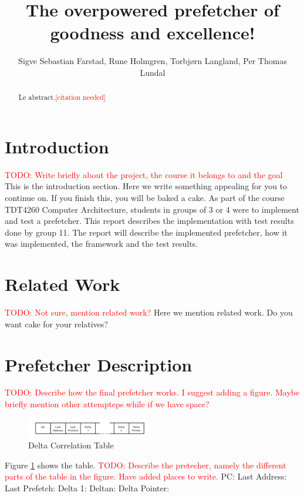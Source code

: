 \documentclass[a4paper]{IEEEtran}
\title{The overpowered prefetcher of goodness and excellence!}
\author{
    Sigve Sebastian Farstad,
    Rune Holmgren,
    Torbjørn Langland,
    Per Thomas Lundal
}
\newcommand\TODO[1]{\textcolor{red}{TODO:#1}}
\newcommand\todo[1]{\TODO{#1}}
\newcommand\cn{\textcolor{red}{[citation needed]}}
\begin{document}
\maketitle

\begin{abstract}
    Le abstract.\cn
\end{abstract}

\section{Introduction}

\todo{ Write briefly about the project, the course it belongs to and the goal}
\break
This is the introduction section. Here we write something appealing for you to continue on. If you finish this, you will be baked a cake.
\break
\break
As part of the course TDT4260 Computer Architecture, students in groups of 3 or 4 were to implement and test a prefetcher. This report describes the implementation with test results done by group 11. The report will describe the implemented prefetcher, how it was implemented, the framework and the test results.

\section{Related Work}
\todo{ Not sure, mention related work?}
\break
Here we mention related work. Do you want cake for your relatives?
\section{Prefetcher Description}
\todo{ Describe how the final prefetcher works. I suggest adding a figure. Maybe briefly mention other attempteps while if we have space?}
\break

\begin{figure}[h!]
  \centering
      \includegraphics[width=0.5\textwidth]{Figures/DCTable}
  \caption{Delta Correlation Table}
  \label{fig:DCTable}
\end{figure}

\break
Figure \ref{fig:DCTable} shows the table.
\break
\todo{ Describe the pretecher, namely the different parts of the table in the figure. Have added places to write.}
\break
PC:
\break
Last Address:
\break
Last Prefetch:
\break
Delta 1:
\break
Deltan:
\break
Delta Pointer:
\end{document}
